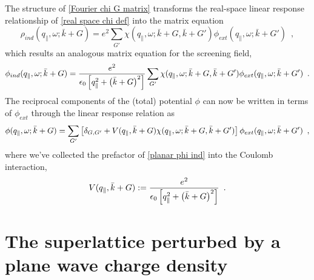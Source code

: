 \documentclass{article}
\begin{document}
The structure of \eqref{Fourier chi G matrix} transforms the real-space linear response relationship of \eqref{real space chi def} into the matrix equation
\begin{equation}
    \label{planar linear response}
     \rho_{ind}(q_\parallel,\omega;\bar k+G) = e^2\sum_{G'}\chi(q_\parallel,\omega;\bar k+G, \bar k+G')
     \phi_{ext}(q_\parallel,\omega;\bar k+G')
     \,\,\,,
\end{equation}
which results an analogous matrix equation for the screening field,
\begin{equation}
    \label{planar phi ind}
     \phi_{ind}(q_\parallel,\omega;\bar k+G) = \frac{e^2}{\epsilon_0\left[ q_\parallel^2+\left(\bar k+G\right)^2\right]} \sum_{G'}\chi(q_\parallel,\omega;\bar k+G, \bar k+G')
     \phi_{ext}(q_\parallel,\omega;\bar k+G')
     \,\,\,.
\end{equation}
The reciprocal components of the (total) potential $\phi$ can now be written in terms of $\phi_{ext}$ through the linear response relation as
\begin{equation}
    \label{planar phi to phi ext relation}
    \phi(q_\parallel,\omega;\bar k+G) 
    =
    \sum_{G'}
    \left[
    \delta_{G,G'}
    +
    V(q_\parallel,\bar k+G)
    \chi(q_\parallel,\omega;\bar k+G, \bar k+G')
    \right]
    \phi_{ext}(q_\parallel,\omega;\bar k+ G')
    \,\,\,,
\end{equation}
where we've collected the prefactor of \eqref{planar phi ind} into the Coulomb interaction,
\begin{equation}
    \label{V def}
    V(q_\parallel,\bar k+G):=
    \frac{e^2}{\epsilon_0\left[ q_\parallel^2+\left(\bar k+G\right)^2\right]}
    \,\,\,.
\end{equation}
































\section{The superlattice perturbed by a plane wave charge density}
\end{document}

